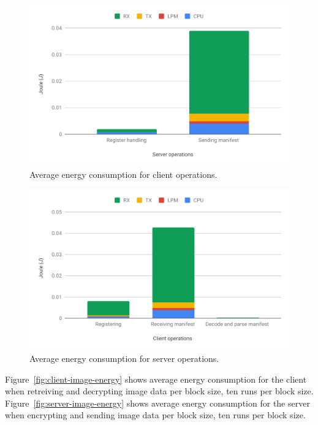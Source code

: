 \documentclass[0-thesis.tex]{subfiles}
\begin{document}
\begin{figure}
    \caption{Average energy consumption for client operations.}
    \label{fig:client-operations-energy}
    \includegraphics[scale=0.8]{images/server-operations-energy.pdf}
\end{figure}

\begin{figure}
    \caption{Average energy consumption for server operations.}
    \label{fig:server-operations-energy}
    \includegraphics[scale=0.8]{images/client-operations-energy.pdf}
\end{figure}

Figure~\ref{fig:client-image-energy} shows average energy consumption for the client when
retreiving and decrypting image data per block size, ten runs per block size.
Figure~\ref{fig:server-image-energy} shows average energy consumption for the server when
encrypting and sending image data per block size, ten runs per block size.
\end{document}
